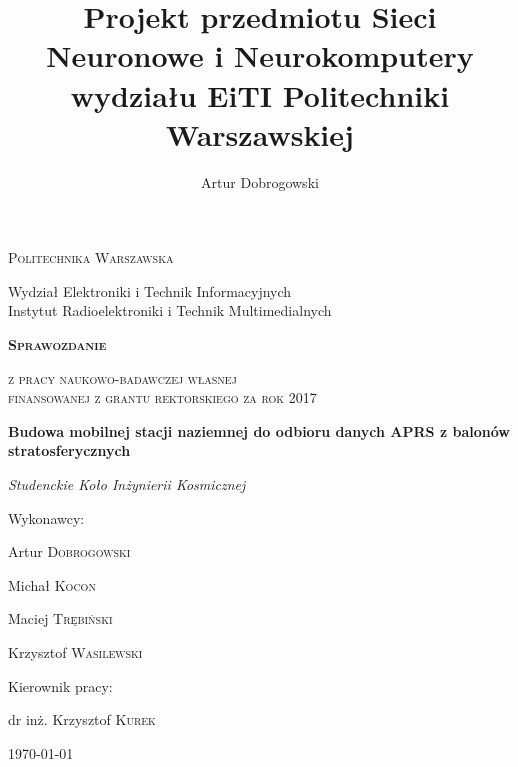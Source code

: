 \documentclass[a4paper,12pt]{article}
\title{Projekt przedmiotu Sieci Neuronowe i Neurokomputery wydziału EiTI Politechniki Warszawskiej}
\author{Artur Dobrogowski}
\newcommand{\radikalwut}{}
\begin{document}
%
\begin{titlepage}
    \centering
    {\scshape\Large {\radikalwut Politechnika Warszawska}\\\par Wydział Elektroniki i Technik Informacyjnych\\Instytut Radioelektroniki i Technik Multimedialnych \par}
    \vspace{1cm}
    {\huge\scshape\bfseries Sprawozdanie\\\par}
    {\scshape\Large z pracy naukowo-badawczej własnej\\ finansowanej z grantu rektorskiego za rok 2017\\\par}
    \vspace{1cm}
    {\Large\bfseries Budowa mobilnej stacji naziemnej do odbioru danych APRS z balonów stratosferycznych\\\par}
    \vspace{1cm}
    {\Large\textsl {Studenckie Koło Inżynierii Kosmicznej}\par}
    \vfill
    Wykonawcy: \par
    {\small
    \begin{multicols}{2}

    \par Artur \textsc{Dobrogowski} 
    \par Michał \textsc{Kocon}
    \par Maciej \textsc{Trębiński}
    \par Krzysztof \textsc{Wasilewski}
    \end{multicols}
}
    Kierownik pracy:\par
    dr inż. Krzysztof \textsc{Kurek}

    \vfill

    {\large \today\par}
\end{titlepage}

\tableofcontents











% 



\label{ENDOFDOC}
\end{document}
